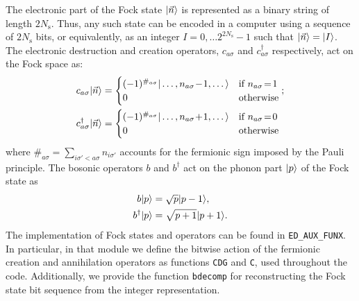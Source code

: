 \documentclass[edipack_sp.tex]{subfiles}
\begin{document}
The electronic part of the Fock state $|\vec{n}\rangle$ is represented
as a binary string of length $2N_\mathrm{s}$. Thus, any such state can be encoded
in a computer using a sequence of $2N_\mathrm{s}$ bits, or equivalently, as an integer $I=0,\dots 2^{2N_\mathrm{s}}-1$ such that $|\vec{n}\rangle=|I\rangle$.  
The electronic destruction and creation operators, $c_{a\sigma}$ and $c^\dagger_{a\sigma}$ 
respectively, act on the Fock space as:
\begin{align*}
  c_{a\sigma}\ket{\vec{n}} &=
    \begin{cases}
      (-1)^{\#_{a\sigma}}\ket{\dots,n_{a\sigma}\!-\!1,\dots}
      &\text{if $n_{a\sigma}\!=\! 1$}\\
      0 &\text{otherwise}
    \end{cases};\\
    c^\dagger_{a\sigma}\ket{\vec{n}} &=
     \begin{cases}
      (-1)^{\#_{a\sigma}}\ket{\dots,n_{a\sigma}\!+\!1,\dots}
      & \text{if $n_{a\sigma}\!=\! 0$}\\
      0 & \text{otherwise}
    \end{cases}    
\end{align*}
where $\#_{a\sigma}=\sum_{i\sigma'<a\sigma} n_{i\sigma'}$ accounts for the fermionic sign imposed by the Pauli principle.
The bosonic operators $b$ and $b^\dagger$ act on the phonon part $|p\rangle$ of the Fock state as
\begin{align*}
  b|p\rangle &= \sqrt{p} |p-1\rangle, \\
  b^\dagger|p\rangle &= \sqrt{p+1}|p+1\rangle.
\end{align*}
The implementation of Fock states and operators can be found in 
{\tt ED\_AUX\_FUNX}. In particular, in that module we define the bitwise action 
of the fermionic creation and annihilation operators as functions 
{\tt CDG} and {\tt C}, used throughout the code. 
Additionally, 
we provide the function {\tt bdecomp} for reconstructing the Fock  state bit sequence from the integer representation. 


\end{document}
